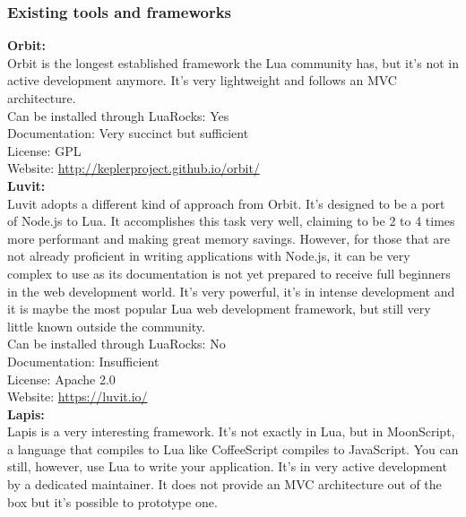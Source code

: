 \documentclass{article}
\begin{document}
\subsubsection{Existing tools and frameworks}

\textbf{Orbit:} \\

Orbit is the longest established framework the Lua community has, but it's not in active development anymore. It's very lightweight and follows an MVC architecture. \\

Can be installed through LuaRocks: Yes\\

Documentation: Very succinct but sufficient\\

License: GPL\\

Website: \url{http://keplerproject.github.io/orbit/}\\

\textbf{Luvit:}\\

Luvit adopts a different kind of approach from Orbit. It's designed to be a port of Node.js to Lua. It accomplishes this task very well, claiming to be 2 to 4 times more performant and making great memory savings. However, for those that are not already proficient in writing applications with Node.js, it can be very complex to use as its documentation is not yet prepared to receive full beginners in the web development world. It's very powerful, it's in intense development and it is maybe the most popular Lua web development framework, but still very little known outside the community.\\

Can be installed through LuaRocks: No\\

Documentation: Insufficient\\

License: Apache 2.0\\ 

Website: \url{https://luvit.io/}\\ 

\textbf{Lapis:}\\

Lapis is a very interesting framework. It's not exactly in Lua, but in MoonScript, a language that compiles to Lua like CoffeeScript compiles to JavaScript. You can still, however, use Lua to write your application. It's in very active development by a dedicated maintainer. It does not provide an MVC architecture out of the box but it's possible to prototype one. \\
\end{document}
